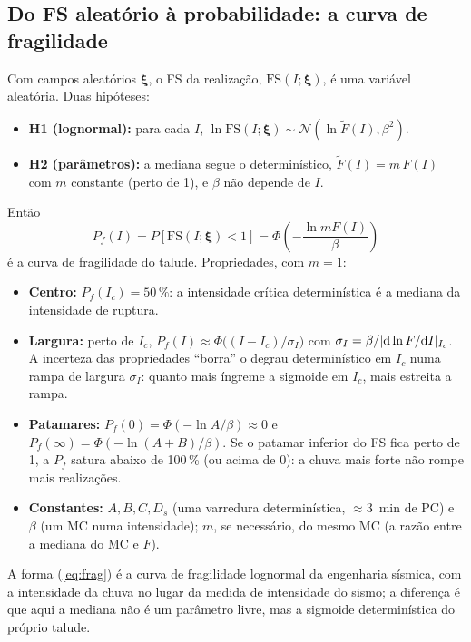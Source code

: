\documentclass[11pt,a4paper]{article}
\newcommand{\Pf}{P_f}
\begin{document}
\subsection{Do FS aleatório à probabilidade: a curva de fragilidade}
Com campos aleatórios $\bm\xi$, o FS da realização, $\mathrm{FS}(I;\bm\xi)$, é uma variável aleatória. Duas hipóteses:
\begin{itemize}
  \item \textbf{H1 (lognormal):} para cada $I$, $\ln \mathrm{FS}(I;\bm\xi) \sim \mathcal N(\ln \tilde F(I), \beta^2)$.
  \item \textbf{H2 (parâmetros):} a mediana segue o determinístico, $\tilde F(I) = m\,F(I)$ com $m$ constante (perto de
    1), e $\beta$ não depende de $I$.
\end{itemize}
Então
\begin{equation}
\boxed{\;\Pf(I) = P[\mathrm{FS}(I;\bm\xi) < 1] = \Phi\!\left(-\frac{\ln m F(I)}{\beta}\right)\;}\label{eq:frag}
\end{equation}
é a curva de fragilidade do talude. Propriedades, com $m = 1$:
\begin{itemize}
  \item \textbf{Centro:} $\Pf(I_c) = 50\,\%$: a intensidade crítica determinística é a mediana da intensidade de
    ruptura.
  \item \textbf{Largura:} perto de $I_c$, $\Pf(I) \approx \Phi\big((I - I_c)/\sigma_I\big)$ com
    $\sigma_I = \beta / |{\rm d}\ln F/{\rm d}I|_{I_c}$. A incerteza das propriedades ``borra'' o degrau determinístico
    em $I_c$ numa rampa de largura $\sigma_I$: quanto mais íngreme a sigmoide em $I_c$, mais estreita a rampa.
  \item \textbf{Patamares:} $\Pf(0) = \Phi(-\ln A/\beta) \approx 0$ e $\Pf(\infty) = \Phi(-\ln(A+B)/\beta)$. Se o
    patamar inferior do FS fica perto de 1, a $\Pf$ satura abaixo de 100\,\% (ou acima de 0): a chuva mais forte não
    rompe mais realizações.
  \item \textbf{Constantes:} $A, B, C, D_s$ (uma varredura determinística, $\approx 3$~min de PC) e $\beta$ (um MC numa
    intensidade); $m$, se necessário, do mesmo MC (a razão entre a mediana do MC e $F$).
\end{itemize}
A forma (\ref{eq:frag}) é a curva de fragilidade lognormal da engenharia sísmica, com a intensidade da chuva no lugar
da medida de intensidade do sismo; a diferença é que aqui a mediana não é um parâmetro livre, mas a sigmoide
determinística do próprio talude.
\end{document}
